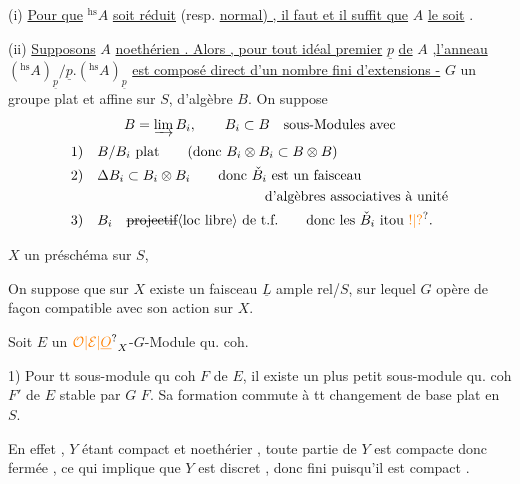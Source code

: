 (i) \uline{Pour que} $ {}^{\mathrm{hs}}A$ \uline{soit réduit} (resp. \uline{normal) , il faut et il suffit que} $A$ \uline{le soit} .

(ii) \uline{Supposons} $A$ \uline{noethérien . Alors , pour tout idéal premier} $\underline{p}$ \uline{de} $A$ ,\uline{l'anneau} $({}^{\mathrm{hs}}A)_{\underline{p}}/\underline{p}.({}^{\mathrm{hs}}A)_{\underline{p}}$ \uline{est composé direct d'un nombre fini d'extensions -}
$G$ un groupe plat et affine sur $S$,
d'algèbre $B$. On suppose
\[
B=\varinjlim B_i,\qquad B_i\subset B\quad\text{sous-Modules avec}
\]
\[
\begin{aligned}
1)\quad &B/B_i\ \text{plat}\qquad(\text{donc }B_i\otimes B_i\subset B\otimes B)\\
2)\quad &\Delta B_i\subset B_i\otimes B_i\qquad\text{donc }\check B_i\text{ est un faisceau}\\
&\hspace{12em}\text{d'algèbres associatives à unité}\\
3)\quad &B_i\quad\text{\deleted{projectif}\inserted{loc libre} de t.f.}\qquad\text{donc les }\check B_i\text{ itou \unsure{!|?}.}
\end{aligned}
\]

$X$ un préschéma sur $S$,  

 On suppose que sur $X$ existe un
faisceau  $\underline L$ ample rel/$S$, sur lequel $G$
opère de façon compatible avec son action sur $X$.

Soit $E$ un $\unsure{\mathcal{O}|\mathcal{E}|\underline{O}}_X$-$G$-Module qu. coh. 

1) Pour tt sous-module qu coh $F$ de $E$,
il existe un plus petit sous-module qu.
coh $F'$ de $E$  stable par $G$  $F$.
Sa  formation commute à
tt changement de base plat en $S$.

En effet , $Y$ étant compact  et noethérier , toute partie de $Y$ est compacte\handwritten{,}
donc fermée , ce qui implique que $Y$ est discret , donc fini puisqu'il est
compact .

